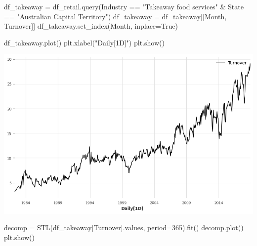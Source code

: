 \documentclass[
  11pt,
]{article}
\newenvironment{Shaded}{\begin{snugshade}}{\end{snugshade}}
\newcommand{\DecValTok}[1]{\textcolor[rgb]{0.68,0.00,0.00}{#1}}
\newcommand{\NormalTok}[1]{\textcolor[rgb]{0.00,0.23,0.31}{#1}}
\newcommand{\OperatorTok}[1]{\textcolor[rgb]{0.37,0.37,0.37}{#1}}
\newcommand{\StringTok}[1]{\textcolor[rgb]{0.13,0.47,0.30}{#1}}
\newcommand{\VariableTok}[1]{\textcolor[rgb]{0.07,0.07,0.07}{#1}}
\begin{document}
\begin{Shaded}
\begin{Highlighting}[]
\NormalTok{df\_takeaway }\OperatorTok{=}\NormalTok{ df\_retail.query(}\StringTok{\textquotesingle{}Industry == "Takeaway food services" \& State == "Australian Capital Territory"\textquotesingle{}}\NormalTok{)}
\NormalTok{df\_takeaway }\OperatorTok{=}\NormalTok{ df\_takeaway[[}\StringTok{\textquotesingle{}Month\textquotesingle{}}\NormalTok{, }\StringTok{\textquotesingle{}Turnover\textquotesingle{}}\NormalTok{]]}
\NormalTok{df\_takeaway.set\_index(}\StringTok{\textquotesingle{}Month\textquotesingle{}}\NormalTok{, inplace}\OperatorTok{=}\VariableTok{True}\NormalTok{)}
\end{Highlighting}
\end{Shaded}

\begin{Shaded}
\begin{Highlighting}[]
\NormalTok{df\_takeaway.plot()}
\NormalTok{plt.xlabel(}\StringTok{"Daily[1D]"}\NormalTok{)}
\NormalTok{plt.show()}
\end{Highlighting}
\end{Shaded}

\includegraphics{hw3_files/figure-pdf/cell-26-output-1.png}

\begin{Shaded}
\begin{Highlighting}[]
\NormalTok{decomp }\OperatorTok{=}\NormalTok{ STL(df\_takeaway[}\StringTok{\textquotesingle{}Turnover\textquotesingle{}}\NormalTok{].values, period}\OperatorTok{=}\DecValTok{365}\NormalTok{).fit()}
\NormalTok{decomp.plot()}
\NormalTok{plt.show()}
\end{Highlighting}
\end{Shaded}
\end{document}
